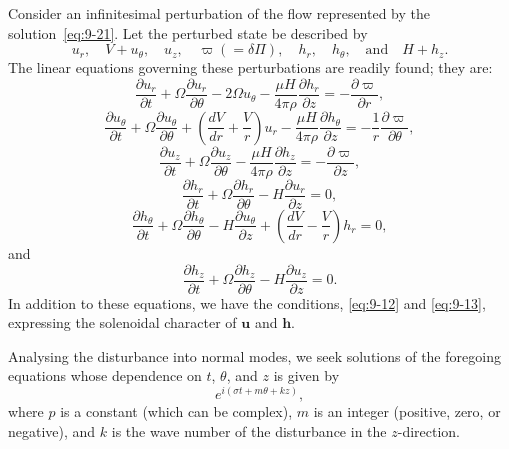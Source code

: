 Consider an infinitesimal perturbation of the flow represented by the solution~\eqref{eq:9-21}. Let the perturbed state be described by
\begin{equation}
u_r, \quad V\!+\!u_\theta, \quad u_z, \quad \varpi (= \delta\Pi), \quad h_r, \quad h_\theta, \quad \text{and} \quad H\!+\!h_z. \label{eq:9-23}
\end{equation}
The linear equations governing these perturbations are readily found; they are:
\begin{equation}
\frac{\partial u_r}{\partial t} + \Omega \frac{\partial u_r}{\partial \theta} - 2\Omega u_\theta - \frac{\mu H}{4\pi\rho}\frac{\partial h_r}{\partial z} = -\frac{\partial \varpi}{\partial r}, \label{eq:9-24}
\end{equation}
\begin{equation}
\frac{\partial u_\theta}{\partial t} + \Omega \frac{\partial u_\theta}{\partial \theta} + \left(\frac{dV}{dr} + \frac{V}{r}\right) u_r - \frac{\mu H}{4\pi\rho}\frac{\partial h_\theta}{\partial z} = -\frac{1}{r}\frac{\partial \varpi}{\partial \theta}, \label{eq:9-25}
\end{equation}
\begin{equation}
\frac{\partial u_z}{\partial t} + \Omega \frac{\partial u_z}{\partial \theta} - \frac{\mu H}{4\pi\rho}\frac{\partial h_z}{\partial z} = -\frac{\partial \varpi}{\partial z}, \label{eq:9-26}
\end{equation}
\begin{equation}
\frac{\partial h_r}{\partial t} + \Omega \frac{\partial h_r}{\partial \theta} - H \frac{\partial u_r}{\partial z} = 0, \label{eq:9-27}
\end{equation}
\begin{equation}
\frac{\partial h_\theta}{\partial t} + \Omega \frac{\partial h_\theta}{\partial \theta} - H \frac{\partial u_\theta}{\partial z} + \left(\frac{dV}{dr} - \frac{V}{r}\right) h_r = 0, \label{eq:9-28}
\end{equation}
and
\begin{equation}
\frac{\partial h_z}{\partial t} + \Omega \frac{\partial h_z}{\partial \theta} - H \frac{\partial u_z}{\partial z} = 0. \label{eq:9-29}
\end{equation}
In addition to these equations, we have the conditions, \eqref{eq:9-12} and \eqref{eq:9-13}, expressing the solenoidal character of $\mathbf{u}$ and $\mathbf{h}$.

Analysing the disturbance into normal modes, we seek solutions of the foregoing equations whose dependence on $t$, $\theta$, and $z$ is given by
\begin{equation}
e^{i(\sigma t + m\theta + kz)}, \label{eq:9-30}
\end{equation}
where $p$ is a constant (which can be complex), $m$ is an integer (positive, zero, or negative), and $k$ is the wave number of the disturbance in the $z$-direction.

